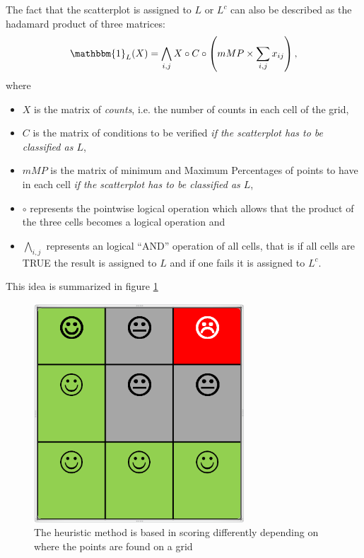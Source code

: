\documentclass[a4paper,10pt]{article}\usepackage[]{graphicx}\usepackage[]{color}
\begin{document}
The fact that the scatterplot is assigned to $L$ or $L^c$ can also be described as the hadamard product of three matrices:
\begin{equation}
\mathbbm{1}_L(X) = \bigwedge_{i,j} X \circ C \circ \left( mMP \times \sum_{i,j}x_{ij}\right),
\end{equation}
where 
\begin{itemize}
\item ${X}$ is the matrix of \emph{counts}, i.e. the number of counts in each cell of the grid,
\item $C$ is the matrix of conditions to be verified \emph{if the scatterplot has to be classified as $L$},
\item $mMP$ is the matrix of minimum and Maximum Percentages of points to have in each cell \emph{if the scatterplot has to be classified as $L$},
\item $\circ$ represents the pointwise logical operation which allows that the product of the three cells becomes a logical operation and
\item $\bigwedge_{i,j}$ represents an logical ``AND'' operation of all cells, that is if all cells are TRUE the result is assigned to $L$ and if one fails it is assigned to $L^c$.
\end{itemize}

This idea is summarized in figure \ref{Lscore}
\begin{figure}[htbp]
\centering
	\includegraphics[width=0.7\textwidth]{./images/Lscoring.png}
\caption{The heuristic method is based in scoring differently depending on where the points are found on a grid\label{Lscore}}
\end{figure}
\end{document}
